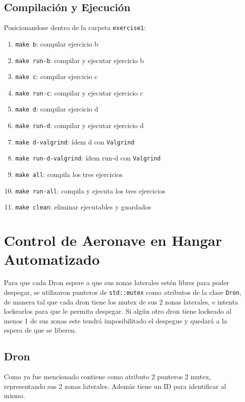 \documentclass[11pt, a4paper]{article}
\begin{document}
\begin{multicols}{2}
\subsection{Compilación y Ejecución}

Posicionandose dentro de la carpeta \lstinline|exercise1|:
\begin{enumerate}[label=\roman*.]
    \item \lstinline|make b|: compilar ejercicio b
    \item \lstinline|make run-b|: compilar y ejecutar ejercicio b
    \item \lstinline|make c|: compilar ejercicio c
    \item \lstinline|make run-c|: compilar y ejecutar ejercicio c
    \item \lstinline|make d|: compilar ejercicio d
    \item \lstinline|make run-d|: compilar y ejecutar ejercicio d
    \item \lstinline|make d-valgrind|: ídem d con \lstinline|Valgrind|
    \item \lstinline|make run-d-valgrind|: ídem run-d con \lstinline|Valgrind|
    \item \lstinline|make all|: compila los tres ejercicios
    \item \lstinline|make run-all|: compila y ejecuta los tres ejercicios
    \item \lstinline|make clean|: eliminar ejecutables y guardados
\end{enumerate}

\section{Control de Aeronave en Hangar Automatizado}

Para que cada Dron espere a que sus zonas laterales estén libres para poder despegar, se utilizaron punteros de \lstinline|std::mutex| como atributos de la clase \lstinline|Dron|, de manera tal que cada dron tiene los mutex de sus 2 zonas laterales, e intenta lockearlos para que le permita despegar. Si algún otro dron tiene lockeado al menos 1 de sus zonas este tendrá imposibilitado el despegue y quedará a la espera de que se liberen.

\subsection{Dron}

Como ya fue mencionado contiene como atributo 2 punteros 2 mutex, representando sus 2 zonas laterales. Además tiene un ID para identificar al mismo.


\end{multicols}
\end{document}

